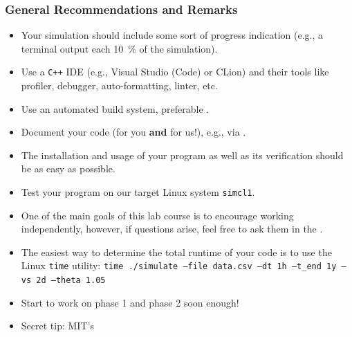 \begin{frame}[fragile]
  \frametitle{General Recommendations and Remarks}
  \begin{itemize}
    \item Your simulation should include some sort of progress indication (e.g., a terminal output each \SI{10}{\percent} of the simulation).
    \item Use a \texttt{C++} IDE (e.g., Visual Studio (Code) or CLion) and their tools like profiler, debugger, auto-formatting, linter, etc.
    \item Use an automated build system, preferable .
    \item Document your code (for you \textbf{and} for us!), e.g., via .
    \item The installation and usage of your program as well as its verification should be as easy as possible.
    \item Test your program on our target Linux system \texttt{simcl1}.
    \item One of the main goals of this lab course is to encourage working independently, however, if questions arise, feel free to ask them in the .
    \item The easiest way to determine the total runtime of your code is to use the Linux \texttt{time} utility: \texttt{time ./simulate --file data.csv --dt 1h --t_end 1y --vs 2d --theta 1.05}
    \item Start to work on phase 1 and phase 2 soon enough!
    \item Secret tip: MIT's 
  \end{itemize}
\end{frame}


